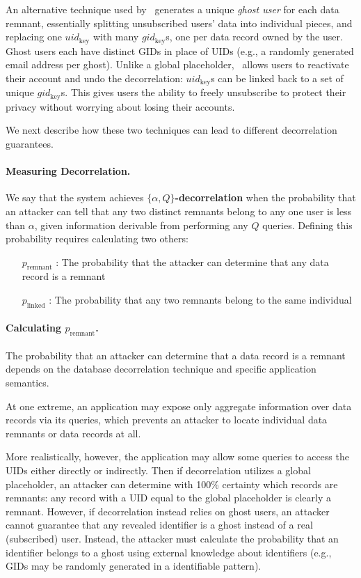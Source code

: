 An alternative technique used by \sys~generates a unique \emph{ghost user} for each data remnant,
essentially splitting unsubscribed users' data into individual pieces, and replacing one
$uid_\text{key}$ with many $gid_\text{key}$s, one per data record owned by the user. Ghost users each have
distinct GIDs in place of UIDs (e.g., a randomly generated email
address per ghost).  Unlike a global placeholder, \sys~allows users to reactivate their account and
undo the decorrelation: $uid_\text{key}$s can be linked back to a set of unique $gid_\text{key}$s.
This gives users the ability to freely unsubscribe to protect their privacy without worrying about
losing their accounts.   

We next describe how these two techniques can lead to different decorrelation guarantees.

\paragraph{Measuring Decorrelation.} 
We say that the system achieves \textbf{$\{\alpha,Q\}$-decorrelation} when the probability that an attacker
can tell that any two distinct remnants belong to any one user is less than $\alpha$, given
information derivable from performing any $Q$ queries.
Defining this probability requires calculating two others: \begin{enumerate}
    \item[$p_{\text{remnant}}$]: 
        The probability that the attacker can determine that any data record is a remnant
    \item[$p_{\text{linked}}$]:
        The probability that any two remnants belong to the same individual
\end{enumerate}

\paragraph{Calculating $p_{\text{remnant}}$.}
The probability that an attacker can determine that a data record is a remnant depends on the
database decorrelation technique and specific application semantics.

At one extreme, an application may expose only aggregate information over data records via its
queries, which prevents an attacker to locate individual data remnants or data records at all. 

More realistically, however, the application may allow some queries to access the UIDs either
directly or indirectly. Then if decorrelation utilizes a global placeholder, an attacker can
determine with 100\% certainty which records are remnants: any record with a UID equal to the global
placeholder is clearly a remnant. However, if decorrelation instead relies on ghost users, an
attacker cannot guarantee that any revealed identifier is a ghost instead of a real (subscribed)
user. Instead, the attacker must calculate the probability that an identifier belongs to a ghost
using external knowledge about identifiers (e.g., GIDs may be randomly generated in a identifiable
pattern). 

